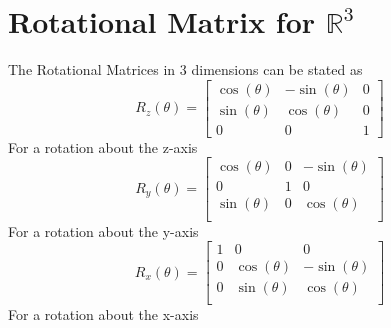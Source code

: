 \section{Rotational Matrix for $\mathbb{R}^3$}
The Rotational Matrices in 3 dimensions can be stated as
\[
R_z(\theta) = \left[ \begin{matrix}
\cos(\theta) & -\sin(\theta) & 0\\
\sin(\theta) &  \cos(\theta) & 0\\
0 & 0 & 1 
\end{matrix}\right]
\]
For a rotation about the z-axis\\
\[
R_y(\theta) = \left[ \begin{matrix}
\cos(\theta) &  0 &-\sin(\theta) \\
0 & 1 & 0 \\
\sin(\theta) &  0 &\cos(\theta)\\
\end{matrix}\right]
\]
For a rotation about the y-axis
\[
R_x(\theta) = \left[ \begin{matrix}
1 & 0 & 0\\
0 & \cos(\theta) & -\sin(\theta) \\
0 & \sin(\theta) &  \cos(\theta) \\
\end{matrix}\right]
\]
For a rotation about the x-axis
\\
